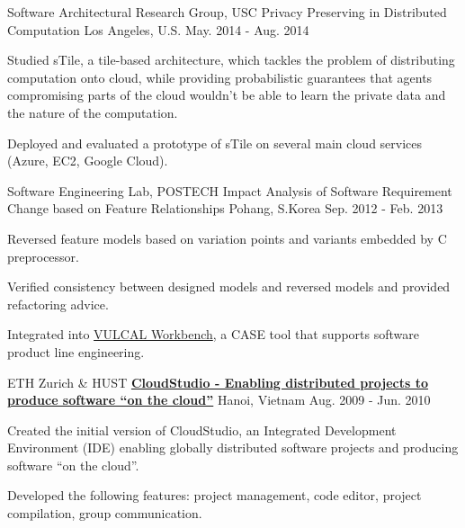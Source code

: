 \begin{cventries}
\cventry
{{Software Architectural Research Group}, USC} %
{Privacy Preserving in Distributed Computation} %
{Los Angeles, U.S.} %
{May. 2014 - Aug. 2014} %
{
  	\begin{cvitems} %
  		\item Studied sTile, a tile-based architecture, which tackles the problem of distributing computation onto cloud, while providing probabilistic guarantees that agents compromising parts of the cloud wouldn't be able to learn the private data and the nature of the computation.
  		\item Deployed and evaluated a prototype of sTile on several main cloud services (Azure, EC2, Google Cloud).
  	\end{cvitems}
}
   
  \cventry
    {Software Engineering Lab, POSTECH } %
    {Impact Analysis of Software Requirement Change based on Feature Relationships} %
    {Pohang, S.Korea} %
    {Sep. 2012 - Feb. 2013} %
    {
      \begin{cvitems} %
        \item Reversed feature models based on variation points and variants embedded by C preprocessor.
        \item Verified consistency between designed models and reversed models and provided refactoring advice.
        \item Integrated into \href{http://productlinetech.com}{VULCAL Workbench}, a CASE tool that supports software product line engineering.
      \end{cvitems} 
    }
    
  \cventry
    {{ETH Zurich} \&  HUST} %
    {\href{http://se.inf.ethz.ch/research/cloudstudio/}{\bf CloudStudio - Enabling distributed projects to produce software “on the cloud”}} %
    {Hanoi, Vietnam} %
    {Aug. 2009 - Jun. 2010} %
    {
      \begin{cvitems} %
       \item Created the initial version of CloudStudio, an Integrated Development Environment (IDE) enabling globally distributed software projects and producing software ``on the cloud”.
       \item Developed the following features: project management, code editor, project compilation, group communication.
      \end{cvitems}
    }

\end{cventries}
